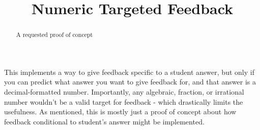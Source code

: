 \documentclass{ximera}
\title{Numeric Targeted Feedback}
\def\HCode{}
\begin{document}
\setcounter{feedbackOutput}{0}

\newcommand{\feedbackOutput}[1]{
    \HCode{<p id="#1">}
    \HCode{</p>}
    }
\begin{abstract}
    A requested proof of concept
\end{abstract}
\maketitle

This implements a way to give feedback specific to a student answer, but only if you can predict what answer you want to give feedback for, and that answer is a decimal-formatted number. Importantly, any algebraic, fraction, or irrational number wouldn't be a valid target for feedback - which drastically limits the usefulness. As mentioned, this is mostly just a proof of concept about how feedback conditional to student's answer might be implemented.
\end{document}
